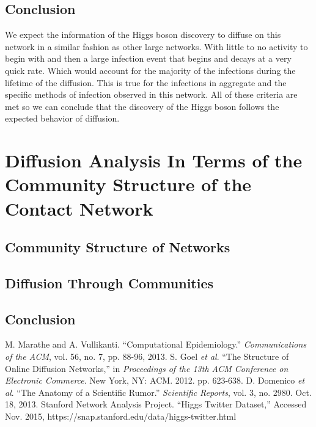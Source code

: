 \documentclass[12pt, oneside, openany]{article} %
\begin{document}
\subsection{Conclusion}
We expect the information of the Higgs boson discovery to diffuse on this network in a similar fashion as other large networks. With little to no activity to begin with and then a large infection event that begins and decays at a very quick rate. Which would account for the majority of the infections during the lifetime of the diffusion. This is true for the infections in aggregate and the specific methods of infection observed in this network. All of these criteria are met so we can conclude that the discovery of the Higgs boson follows the expected behavior of diffusion.

\section{Diffusion Analysis In Terms of the Community Structure of the Contact Network}
\subsection{Community Structure of Networks}
\subsection{Diffusion Through Communities}
\subsection{Conclusion}

\newpage
\begin{thebibliography}{1}
 M. Marathe and A. Vullikanti. ``Computational Epidemiology.'' \emph{Communications of the ACM}, vol. 56, no. 7, pp. 88-96, 2013.
 S. Goel \emph{et al}. ``The Structure of Online Diffusion Networks,'' in \emph{Proceedings of the 13th ACM Conference on Electronic Commerce}. New York, NY: ACM. 2012. pp. 623-638.
 D. Domenico \emph{et al}. ``The Anatomy of a Scientific Rumor.'' \emph{Scientific Reports}, vol. 3, no. 2980. Oct. 18, 2013.
Stanford Network Analysis Project. ``Higgs Twitter Dataset,'' Accessed Nov. 2015, https://snap.stanford.edu/data/higgs-twitter.html
 \end{thebibliography}
\end{document}
